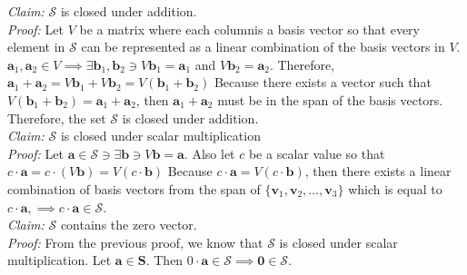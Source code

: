 \documentclass{article}
\begin{document}
{\it Claim:} $\mathcal{S}$ is closed under addition. \\[0.05in]
{\it Proof: } Let $V$ be a matrix where each column\footnotemark[1] is a basis vector so that every element in $\mathcal{S}$ can be represented as a linear combination of the basis vectors in $V$. $\mathbf{a}_1,\mathbf{a}_2 \in V \implies \exists \mathbf{b}_1, \mathbf{b}_2 \ni V\mathbf{b}_1 = \mathbf{a}_1$ and $V\mathbf{b}_2 = \mathbf{a}_2$. Therefore, $\mathbf{a}_1 + \mathbf{a}_2 = V\mathbf{b}_1 + V\mathbf{b}_2 = V(\mathbf{b}_1 + \mathbf{b}_2)$ Because there exists a vector such that $V(\mathbf{b}_1 + \mathbf{b}_2) = \mathbf{a}_1 + \mathbf{a}_2$, then $\mathbf{a}_1 + \mathbf{a}_2$ must be in the span of the basis vectors. Therefore, the set $\mathcal{S}$ is closed under addition.\\[0.05in]
{\it Claim: } $\mathcal{S}$ is closed under scalar multiplication \\[0.05in]
{\it Proof: } Let $\mathbf{a} \in \mathcal{S} \ni \exists \mathbf{b} \ni V\mathbf{b} = \mathbf{a}$. Also let $c$ be a scalar value so that $c\cdot \mathbf{a} = c\cdot (V\mathbf{b}) = V(c\cdot \mathbf{b})$ Because $c\cdot\mathbf{a} = V(c\cdot \mathbf{b})$, then there exists a linear combination of basis vectors from the span of $\{\mathbf{v}_1,\mathbf{v}_2,\hdots,\mathbf{v}_3\}$ which is equal to $c\cdot \mathbf{a}, \implies c\cdot \mathbf{a} \in \mathcal{S}$.  \\[0.05in]
{\it Claim: } $\mathcal{S}$ contains the zero vector. \\[0.05in]
{\it Proof: } From the previous proof, we know that $\mathcal{S}$ is closed under scalar multiplication. Let $\mathbf{a} \in \mathbf{S}$. Then $0\cdot \mathbf{a} \in \mathcal{S} \implies \mathbf{0} \in \mathcal{S}$.
\end{document}
